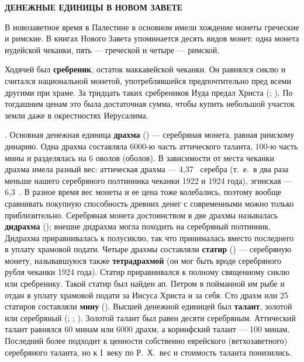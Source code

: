 \thispagestyle{empty}
\pagestyle{fancy}

\begin{center}
\normalsize\bfseries
ДЕНЕЖНЫЕ ЕДИНИЦЫ В НОВОМ ЗАВЕТЕ
\end{center}

В новозаветное время в Палестине в основном имели хождение монеты
греческие и римские. В книгах Нового Завета упоминается десять видов
монет: одна монета иудейской чеканки, пять --- греческой и четыре ---
римской.

Ходячей  был \textbf{сребреник}, остаток
маккавейской чеканки. Он равнялся сиклю и считался национальной
монетой, употреблявшейся предпочтительно пред всеми другими при
храме. За тридцать таких сребреников Иуда предал Христа (; ). По тогдашним ценам это была
достаточная сумма, чтобы купить небольшой участок земли даже в
окрестностях Иерусалима.

. Основная денежная единица \textbf{драхма}
() --- серебряная монета, равная
римскому динарию. Одна драхма составляла 6000-ю часть аттического таланта,
100-ю часть мины и разделялась на 6 оволов (оболов). В зависимости от
места чеканки драхма имела разный вес: аттическая драхма ---
4,37~ серебра (т.~е.\ в два раза меньше нашего серебряного
полтинника чеканки 1922 и 1924 года), эгинская --- 6,3~. В
разное время вес монеты и ее цена тоже колебались, поэтому вообще
сравнивать покупную способность древних денег с современными можно
только приблизительно. Серебряная монета достоинством в две драхмы
называлась \textbf{дидрахма} (); внешне дидрахма
могла походить на серебряный полтинник. Дидрахма приравнивалась к
полусиклю, так что принималась вместо последнего в уплату храмовой
подати. Четыре драхмы составляли \textbf{статир} () ---
серебряную монету, называвшуюся также \textbf{тетрадрахмой} (он мог
быть вроде серебряного рубля чеканки 1924 года). Статир приравнивался
к полному священному сиклю или сребренику. Такой статир был найден
ап. Петром в пойманной им рыбе и отдан в уплату храмовой подати за
Иисуса Христа и за себя. Сто драхм или 25 статиров составляли
\textbf{мину} (). Высшей денежной единицей был
\textbf{талант}, золотой или серебряный (;
; ). Золотой талант был
равен десяти серебряным. Аттический талант равнялся 60 минам или 6000
драхм, а коринфский талант --- 100 минам. Последний более подходит к
ценности собственно еврейского (ветхозаветного) серебряного таланта,
но к I~веку по Р.~Х.\ вес и стоимость таланта понизились.



